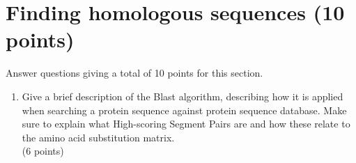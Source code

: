 \documentclass[11pt]{article}
\begin{document}
\section{Finding homologous sequences (10 points)}
Answer questions giving a total of 10 points for this section.
\begin{enumerate}

\item Give a brief description of the Blast algorithm, describing how it is
  applied when searching a protein sequence against protein sequence
  database. Make sure to explain what High-scoring Segment Pairs are and how these
  relate to the amino acid substitution matrix.\\
(6 points)








  

\end{enumerate}
\end{document}
